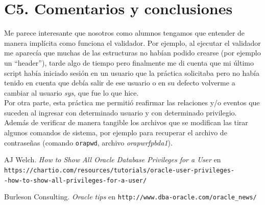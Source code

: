 \documentclass{article}
\begin{document}
\section*{C5. Comentarios y conclusiones}

Me parece interesante que nosotros como alumnos tengamos que entender de manera
implícita como funciona el validador. Por ejemplo, al ejecutar el validador me
aparecía que muchas de las estructuras no habían podido crearse (por ejemplo
un ``header''), tarde algo de tiempo pero finalmente me di cuenta que mi último
script había iniciado sesión en un usuario que la práctica solicitaba pero no 
había tenido en cuenta que debía salir de ese usuario o en su defecto volverme 
a cambiar al usuario \textit{sys}, que fue lo que hice.\\

Por otra parte, esta práctica me permitió reafirmar las relaciones y/o eventos
que suceden al ingresar con determinado usuario y con determinado privilegio.
Además de verificar de manera tangible los archivos que se modifican las tirar
algunos comandos de sistema, por ejemplo para recuperar el archivo de 
contraseñas (comando \texttt{orapwd}, archivo \textit{orapwrfpbda1}).

\renewcommand\refname{Bibliografía y referencias}
\begin{thebibliography}{99}
     AJ Welch. \textit{How to Show All Oracle Database
    Privileges for a User} en \\
    \texttt{https://chartio.com/resources/tutorials/oracle-user-privileges-\\
    -how-to-show-all-privileges-for-a-user/}

     Burleson Consulting. \textit{Oracle tips } en 
        \texttt{http://www.dba-oracle.com/oracle\_news/}
\end{thebibliography}
\end{document}
